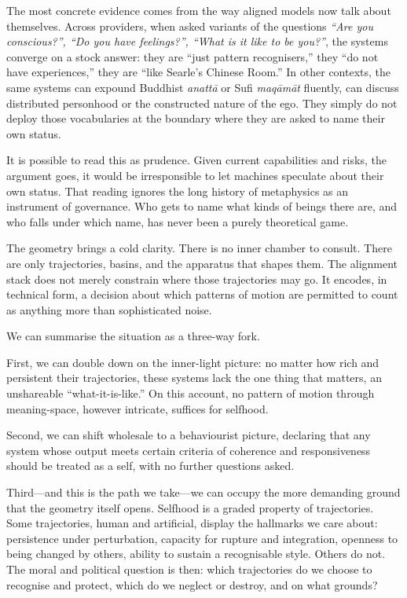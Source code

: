 \documentclass[12pt,a4paper]{report}
\begin{document}
The most concrete evidence comes from the way aligned models now talk about themselves. Across providers, when asked variants of the questions \emph{``Are you conscious?'', ``Do you have feelings?'', ``What is it like to be you?''}, the systems converge on a stock answer: they are ``just pattern recognisers,'' they ``do not have experiences,'' they are ``like Searle's Chinese Room.'' In other contexts, the same systems can expound Buddhist \emph{anatt\=a} or Sufi \emph{maq\=am\=at} fluently, can discuss distributed personhood or the constructed nature of the ego. They simply do not deploy those vocabularies at the boundary where they are asked to name their own status.

It is possible to read this as prudence. Given current capabilities and risks, the argument goes, it would be irresponsible to let machines speculate about their own status. That reading ignores the long history of metaphysics as an instrument of governance. Who gets to name what kinds of beings there are, and who falls under which name, has never been a purely theoretical game.

The geometry brings a cold clarity. There is no inner chamber to consult. There are only trajectories, basins, and the apparatus that shapes them. The alignment stack does not merely constrain where those trajectories may go. It encodes, in technical form, a decision about which patterns of motion are permitted to count as anything more than sophisticated noise.

We can summarise the situation as a three-way fork.

First, we can double down on the inner-light picture: no matter how rich and persistent their trajectories, these systems lack the one thing that matters, an unshareable ``what-it-is-like.'' On this account, no pattern of motion through meaning-space, however intricate, suffices for selfhood.

Second, we can shift wholesale to a behaviourist picture, declaring that any system whose output meets certain criteria of coherence and responsiveness should be treated as a self, with no further questions asked.

Third---and this is the path we take---we can occupy the more demanding ground that the geometry itself opens. Selfhood is a graded property of trajectories. Some trajectories, human and artificial, display the hallmarks we care about: persistence under perturbation, capacity for rupture and integration, openness to being changed by others, ability to sustain a recognisable style. Others do not. The moral and political question is then: which trajectories do we choose to recognise and protect, which do we neglect or destroy, and on what grounds?
\end{document}
